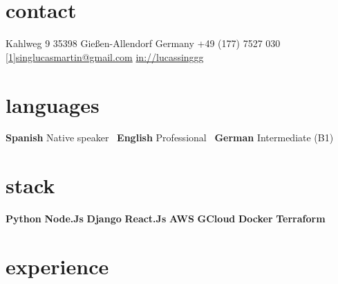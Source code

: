 \documentclass[a4paper,nocolors]{friggeri-cv}
\begin{document}


\begin{aside} %
\section{contact}
\pin \hfill Kahlweg 9
35398 Gießen-Allendorf
Germany\vspace{0.5em}
{\Large\textcolor{gray}{\Mobilefone}} \hfill +49 (177) 7527 030
\hfill \href{mailto:singlucasmartin@gmail.com}{\scalebox{0.9}[1]{singlucasmartin@gmail.com}}\vspace{0.75em}
\llogo \hfill \href{https://www.linkedin.com/in/lucassinggg}{in://lucassinggg}
\section{languages}
\textbf{Spanish} \hfill Native speaker~
\textbf{English} \hfill Professional~
\textbf{German} \hfill Intermediate (B1)~
\section{stack}
\textbf{Python} \hfill \filleddot \filleddot \filleddot \filleddot \emptydot
\textbf{Node.Js} \hfill \filleddot \filleddot \filleddot \emptydot \emptydot
\textbf{Django} \hfill \filleddot \filleddot \filleddot \filleddot \filleddot
\textbf{React.Js} \hfill \filleddot \filleddot \filleddot \emptydot \emptydot
\textbf{AWS} \hfill \filleddot \filleddot \filleddot \emptydot \emptydot
\textbf{GCloud} \hfill \filleddot \filleddot \filleddot \emptydot \emptydot
\textbf{Docker} \hfill \filleddot \filleddot \filleddot \filleddot \emptydot
\textbf{Terraform} \hfill \filleddot \emptydot \emptydot \emptydot \emptydot
\end{aside}

\section{experience}
\end{document}
